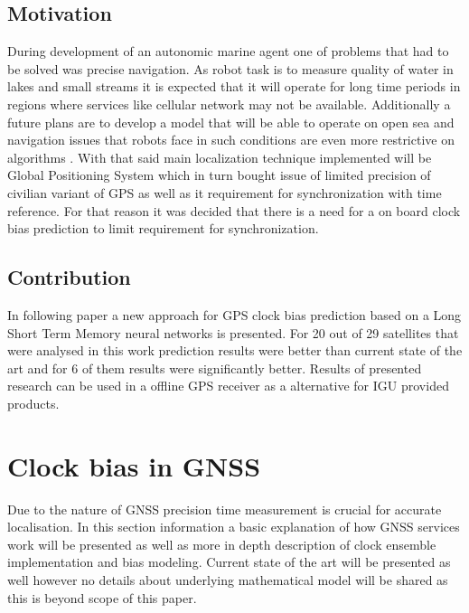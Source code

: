 \documentclass{kybernetika}
\begin{document}
\subsection{Motivation}
During development of an autonomic marine agent one of problems that had to be solved was 
precise navigation. As robot task is to measure quality of water in lakes and small streams
it is expected that it will operate for long time periods in regions where services like 
cellular network may not be available. Additionally a future plans are to develop a model that
will be able to operate on open sea and navigation issues that robots face in such conditions
are even more restrictive on algorithms \cite{Cabrera-Gamez2014}. 
With that said main localization technique implemented
will be Global Positioning System which in turn bought issue of limited precision of civilian
variant of GPS as well as it requirement for synchronization with time reference.
For that reason it was decided that there is a need for a on board clock bias prediction to limit
requirement for synchronization.

\subsection{Contribution}
In following paper a new approach for GPS clock bias prediction based on a Long Short Term Memory
neural networks is presented. For 20 out of 29 satellites that were analysed in this work 
prediction results were better than current state of the art and for 6 of them results were
significantly better. Results of presented research can be used in a offline GPS receiver as 
a alternative for IGU provided products.


\section{Clock bias in GNSS}
Due to the nature of GNSS precision time measurement is crucial for accurate localisation.
In this section information a basic explanation of how GNSS services work will be presented
as well as more in depth description of clock ensemble implementation and bias modeling.
Current state of the art will be presented as well however no details about underlying 
mathematical model will be shared as this is beyond scope of this paper.
\end{document}

